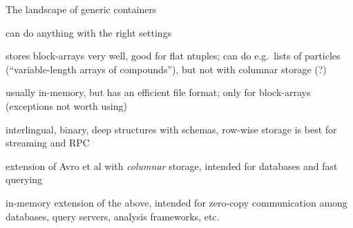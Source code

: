 \documentclass{beamer}
\begin{document}
\begin{frame}{The landscape of generic containers}
\vspace{0.25 cm}
\begin{description}\setlength{\itemsep}{0.25 cm}
\item[ROOT:] can do anything with the right settings
\item[HDF5:] stores block-arrays very well, good for flat ntuples; can do e.g.\ lists of particles (``variable-length arrays of compounds''), but not with columnar storage (?)
\item[Numpy:] usually in-memory, but has an efficient file format; only for block-arrays (exceptions not worth using)
\item[Avro et al:] interlingual, binary, deep structures with schemas, row-wise storage is best for streaming and RPC
\item[Parquet:] extension of Avro et al with {\it columnar} storage, intended for databases and fast querying
\item[Arrow:] in-memory extension of the above, intended for zero-copy communication among databases, query servers, analysis frameworks, etc.
\end{description}
\end{frame}
\end{document}
